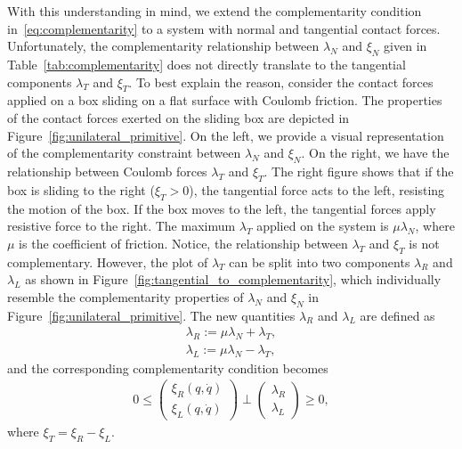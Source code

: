 {With this understanding in mind, we extend the complementarity condition
in~\eqref{eq:complementarity} to a system with normal and tangential contact
forces.
%
Unfortunately, the complementarity relationship between $\lambda_N$ and $\xi_N$
given in Table~\ref{tab:complementarity} does not directly translate to the
tangential components $\lambda_T$ and $\xi_T$.
%
%
To best explain the reason, consider the contact forces applied on a box sliding
on a flat surface with Coulomb friction.
%
The properties of the contact forces exerted on the sliding box are depicted in
Figure~\ref{fig:unilateral_primitive}.
%
On the left, we provide a visual representation of the complementarity
constraint between $\lambda_N$ and $\xi_N$.
%
On the right, we have the relationship between Coulomb forces $\lambda_T$ and
$\xi_T$.
%
The right figure shows that if the box is sliding to the right ($\xi_T > 0$),
the tangential force acts to the left, resisting the motion of the box.
%
If the box moves to the left, the tangential forces apply resistive force to
the right.
%
The maximum $\lambda_T$ applied on the system is $\mu \lambda_N$, where $\mu$ is
the coefficient of friction.
%
Notice, the relationship between $\lambda_T$ and $\xi_T$ is not complementary.
%
However, the plot of $\lambda_T$ can be split into two components $\lambda_R$
and $\lambda_L$ as shown in Figure~\ref{fig:tangential_to_complementarity},
which individually resemble the complementarity properties of $\lambda_N$ and
$\xi_N$ in Figure~\ref{fig:unilateral_primitive}.
%
The new quantities $\lambda_R$ and $\lambda_L$ are defined as~\cite{glocker2005formulation}
\begin{align*}
  \lambda_R := \mu \lambda_N + \lambda_T, \\
  \lambda_L := \mu \lambda_N - \lambda_T, 
\end{align*}
\noindent and the corresponding complementarity condition becomes
%
\begin{equation}
  \begin{gathered}
    0 \leq 
    \begin{pmatrix}
      \xi_R(q, \dot{q}) \\
      \xi_L(q, \dot{q})
    \end{pmatrix} 
    \perp
      \begin{pmatrix}
        \lambda_R  \\
        \lambda_L
      \end{pmatrix} \geq 0,
    \end{gathered}
    \label{eq:tangential_complementarity}
\end{equation}
where $\xi_T = \xi_R - \xi_L$.
%

}
